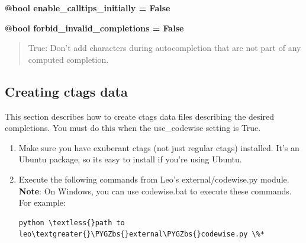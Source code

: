 \documentclass[a4paper,10pt,english]{sphinxmanual}
\def\PYGZbs{\char`\\}
\begin{document}
\textbf{@bool enable\_calltips\_initially = False}

\textbf{@bool forbid\_invalid\_completions = False}
\begin{quote}

True: Don't add characters during autocompletion that are not part of
any computed completion.
\end{quote}


\subsection{Creating ctags data}
\label{commands:creating-ctags-data}
This section describes how to create ctags data files describing the
desired completions. You must do this when the use\_codewise setting is
True.
\begin{enumerate}
\item {} 
Make sure you have exuberant ctags (not just regular ctags)
installed. It's an Ubuntu package, so its easy to install if
you're using Ubuntu.

\item {} 
Execute the following commands from Leo's external/codewise.py
module. \textbf{Note}: On Windows, you can use codewise.bat to
execute these commands. For example:

\begin{Verbatim}[commandchars=\\\{\}]
python \textless{}path to leo\textgreater{}\PYGZbs{}external\PYGZbs{}codewise.py \%*
\end{Verbatim}

\end{enumerate}
\end{document}
